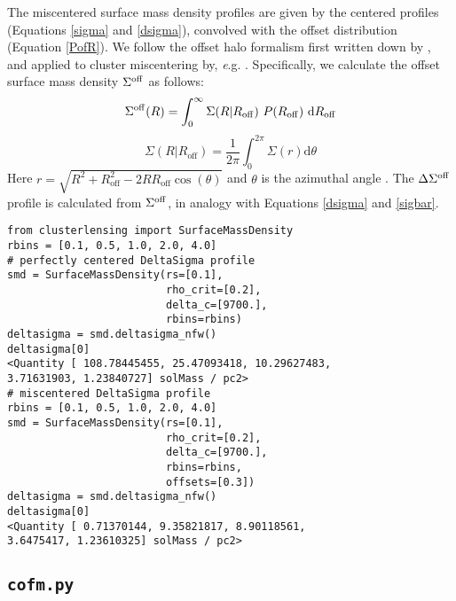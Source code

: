 \documentclass[twocolumn]{aastex6}
\newcommand{\hcode}{\large\normalfont\texttt} %
\begin{document}
The miscentered surface mass density profiles are given by the centered profiles (Equations \ref{sigma} and \ref{dsigma}), convolved with the offset distribution (Equation \ref{PofR}). We follow the offset halo formalism first written down by \citet{Yang06}, and applied to cluster miscentering by, {\textit e.g.} \citet{Johnston07, George12, Ford14, Ford15, Simet16}. Specifically, we calculate the offset surface mass density $\Sigma^{\rm off}$ as follows:
\begin{equation}\label{sigma_off}
\Sigma^{\rm off}(R) = \int_{0}^{\infty} \Sigma(R | R_{\rm off})\ P(R_{\rm off})\ {\rm d}R_{\rm off}
\end{equation}
\begin{equation}\label{sigma_RgivenRoff}
\Sigma(R|R_{\mathrm{off}})=\frac{1}{2\pi}\int_{0}^{2\pi}\Sigma(r) \mathrm{d}\theta
\end{equation}
Here $r = \sqrt{R^2+R_{\mathrm{off}}^2-2RR_{\mathrm{off}}\cos(\theta)}$ and $\theta$ is the azimuthal angle \citep{Yang06}. The $\Delta\Sigma^{\rm off}$ profile is calculated from $\Sigma^{\rm off}$, in analogy with Equations \ref{dsigma} and \ref{sigbar}.

\begin{lstlisting}
from clusterlensing import SurfaceMassDensity
rbins = [0.1, 0.5, 1.0, 2.0, 4.0]
# perfectly centered DeltaSigma profile
smd = SurfaceMassDensity(rs=[0.1], 
                         rho_crit=[0.2], 
                         delta_c=[9700.], 
                         rbins=rbins)
deltasigma = smd.deltasigma_nfw()
deltasigma[0]
<Quantity [ 108.78445455, 25.47093418, 10.29627483, 
3.71631903, 1.23840727] solMass / pc2>
# miscentered DeltaSigma profile
rbins = [0.1, 0.5, 1.0, 2.0, 4.0]
smd = SurfaceMassDensity(rs=[0.1], 
                         rho_crit=[0.2], 
                         delta_c=[9700.], 
                         rbins=rbins,
                         offsets=[0.3])
deltasigma = smd.deltasigma_nfw()
deltasigma[0]
<Quantity [ 0.71370144, 9.35821817, 8.90118561, 
3.6475417, 1.23610325] solMass / pc2>
\end{lstlisting}


\subsection{\hcode{cofm.py}}
\label{cofm}
\end{document}
